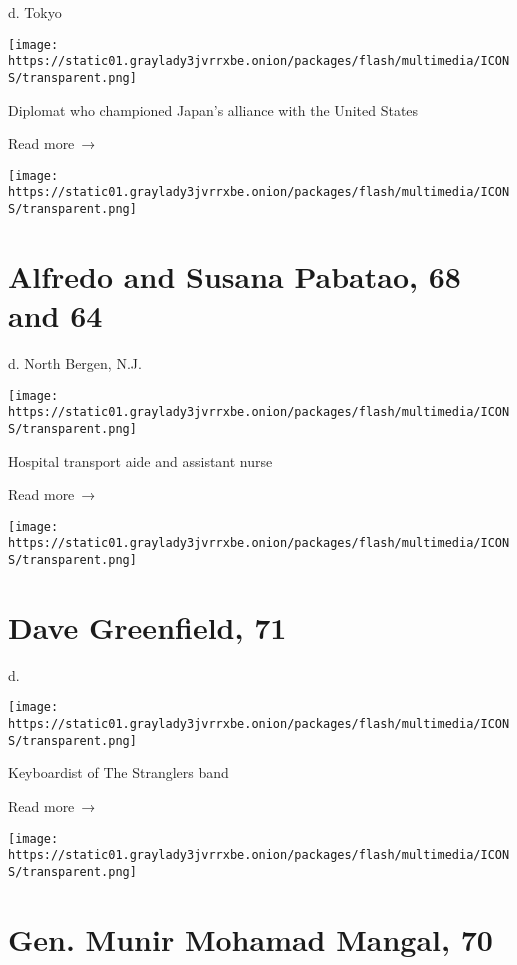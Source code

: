 d. Tokyo

\texttt{[image: https://static01.graylady3jvrrxbe.onion/packages/flash/multimedia/ICONS/transparent.png]}

Diplomat who championed Japan's alliance with the United States

 Read more~→

\href{https://www.nytimes3xbfgragh.onion/2020/05/07/nyregion/alfredo-and-susana-pabatao-dead-coronavirus.html}{}

\texttt{[image: https://static01.graylady3jvrrxbe.onion/packages/flash/multimedia/ICONS/transparent.png]}

\hypertarget{alfredo-and-susana-pabatao-68-and-64}{%
\section{Alfredo and Susana Pabatao, 68 and
64}\label{alfredo-and-susana-pabatao-68-and-64}}

d. North Bergen, N.J.

\texttt{[image: https://static01.graylady3jvrrxbe.onion/packages/flash/multimedia/ICONS/transparent.png]}

Hospital transport aide and assistant nurse

 Read more~→

\href{https://www.nytimes3xbfgragh.onion/2020/05/07/obituaries/dave-greenfield-dead-coronavirus.html}{}

\texttt{[image: https://static01.graylady3jvrrxbe.onion/packages/flash/multimedia/ICONS/transparent.png]}

\hypertarget{dave-greenfield-71}{%
\section{Dave Greenfield, 71}\label{dave-greenfield-71}}

d.

\texttt{[image: https://static01.graylady3jvrrxbe.onion/packages/flash/multimedia/ICONS/transparent.png]}

Keyboardist of The Stranglers band

 Read more~→

\href{https://www.nytimes3xbfgragh.onion/2020/05/06/obituaries/Munir-Mangal-dead-coronavirus.html}{}

\texttt{[image: https://static01.graylady3jvrrxbe.onion/packages/flash/multimedia/ICONS/transparent.png]}

\hypertarget{gen-munir-mohamad-mangal-70}{%
\section{Gen. Munir Mohamad Mangal,
70}\label{gen-munir-mohamad-mangal-70}}

